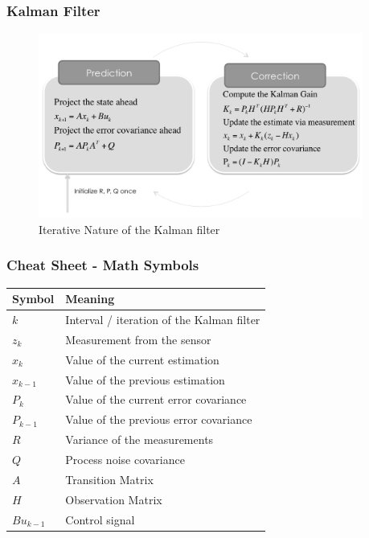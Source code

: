 \documentclass{beamer}
\begin{document}
\begin{frame}
    \frametitle{Kalman Filter}
    \begin{figure}
        \centering
        \includegraphics[width=0.95\textwidth]{images/06_kalman_diagram.png}
        \caption{Iterative Nature of the Kalman filter}
    \end{figure}
\end{frame}

\begin{frame}
    \frametitle{Cheat Sheet - Math Symbols}
    \begin{table}[h]
        \centering
        \begin{tabular}{|l|p{8cm}|}
            \hline
            \textbf{Symbol} & \textbf{Meaning}                          \\ \hline
            \(k\)           & Interval / iteration of the Kalman filter \\ \hline
            \(z_k\)         & Measurement from the sensor               \\ \hline
            \(x_k\)         & Value of the current estimation           \\ \hline
            \(x_{k-1}\)     & Value of the previous estimation          \\ \hline
            \(P_k\)         & Value of the current error covariance     \\ \hline
            \(P_{k-1}\)     & Value of the previous error covariance    \\ \hline
            \(R\)           & Variance of the measurements              \\ \hline
            \(Q\)           & Process noise covariance                  \\ \hline
            \(A\)           & Transition Matrix                         \\ \hline
            \(H\)           & Observation Matrix                        \\ \hline
            \(Bu_{k-1}\)    & Control signal                            \\ \hline
        \end{tabular}
    \end{table}
\end{frame}
\end{document}
